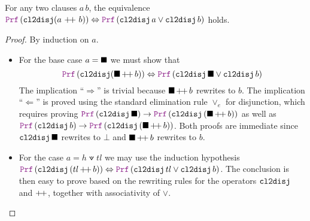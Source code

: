 \smallskip

\begin{lemma}\label{lemma:clause-equiv-disj}
For any two clauses $a\,b$, the equivalence $\prf\,(\cltodisj(a~\pp~b)) \Leftrightarrow \prf\,(\cltodisj\,a \lor \cltodisj\,b)$ holds.
\end{lemma}
\begin{proof} By induction on $a$.
  \begin{itemize}
    \item For the base case $a = \blacksquare$ we must show that
    \[
        \prf\, (\cltodisj (\nil\, \pp \, b)) \Leftrightarrow \prf\, (\cltodisj\,\nil \lor \cltodisj\,b)
    \]
    The implication ``$\Rightarrow$'' is trivial because $\blacksquare\, {+}\!{+} \,b$ rewrites to $b$. The implication ``$\Leftarrow$'' is proved using the standard elimination rule $\lor_e$ for disjunction, which requires proving $\prf\,(\cltodisj\,\nil) \ra \prf\,(\cltodisj\,(\nil\,\pp\,b))$ as well as $\prf\,(\cltodisj\,b) \ra \prf\,(\cltodisj\,(\nil\,\pp\,b))$. Both proofs are immediate since $\texttt{\upshape{cl2disj}}\,\blacksquare$ rewrites to $\bot$ and $\blacksquare\, {+}\!{+} \,b$ rewrites to $b$.
    \item For the case $a = h \veedot tl$ we may use the induction hypothesis $\prf\,(\cltodisj\, (tl\, \pp\, b)) \Leftrightarrow \prf\,(\cltodisj\,tl \lor \cltodisj\, b)$. The conclusion is then easy to prove based on the rewriting rules for the operators $\texttt{\upshape{cl2disj}}$ and $ {+}\!{+} $, together with associativity of $\lor$.
    \end{itemize}
\end{proof}
